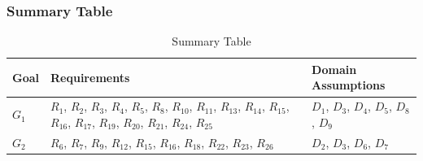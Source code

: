 \subsubsection{Summary Table}
\begin{table}[H]
    \begin{tabular}{|p{1cm}|p{7cm}|p{7cm}|}
        \hline
        \textbf{Goal} & \textbf{Requirements} & \textbf{Domain Assumptions} \\ \hline
        $G_{1}$ & $R_{1}$, $R_{2}$, $R_{3}$, $R_{4}$, $R_{5}$, $R_{8}$, $R_{10}$, $R_{11}$, $R_{13}$, $R_{14}$, $R_{15}$, $R_{16}$, $R_{17}$, $R_{19}$, $R_{20}$, $R_{21}$, $R_{24}$, $R_{25}$ & $D_{1}$, $D_{3}$, $D_{4}$, $D_{5}$, $D_{8}$, $D_{9}$ \\ \hline
        $G_{2}$ & $R_{6}$, $R_{7}$, $R_{9}$, $R_{12}$, $R_{15}$, $R_{16}$, $R_{18}$, $R_{22}$, $R_{23}$, $R_{26}$ & $D_{2}$, $D_{3}$, $D_{6}$, $D_{7}$ \\ \hline
    \end{tabular}
    \caption{Summary Table}
\end{table}

